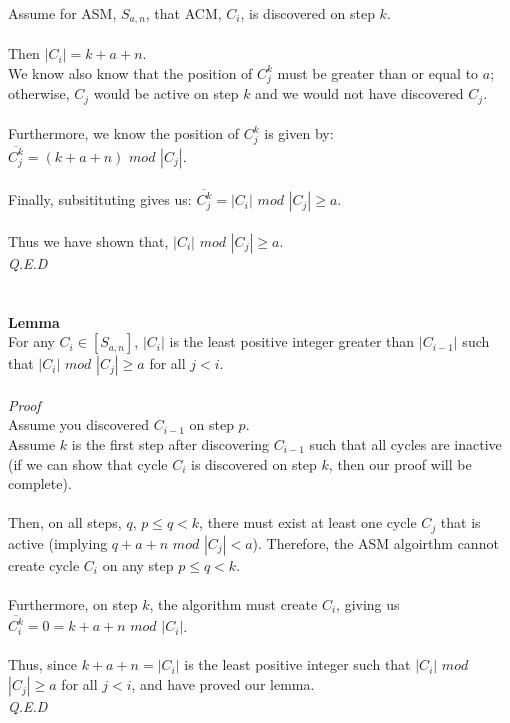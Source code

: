 \documentclass[a4paper,12pt]{article}
\begin{document}
Assume for ASM, $S_{a,n}$, that ACM, $C_i$, is discovered on step $k$.\\
\\
Then $|C_i| = k + a + n$.\\
We know also know that the position of $C^k_j$ must be greater than or equal to $a$; otherwise, $C_j$ would be active on step $k$ and we would not have discovered $C_j$.\\
\\
Furthermore, we know the position of $C^k_j$ is given by:\\
$\overline{C^k_j} = (k + a + n)$ $mod$ $|C_j|$.\\ 
\\
Finally, subsitituting gives us: $\overline{C^k_j} = |C_i|$ $mod$ $|C_j| \geq a$.\\
\\
Thus we have shown that, $|C_i|$ $mod$ $|C_j| \geq a$.\\
\textit{Q.E.D}\\ 
\\
\\
\textbf{Lemma}\\
For any $C_i \in [S_{a,n}]$, $|C_i|$ is the least positive integer greater than $|C_{i-1}|$ such that $|C_i|$ $mod$ $|C_j| \geq a$ for all $j < i$.\\
\\
\textit{Proof}\\
Assume you discovered $C_{i-1}$ on step $p$.\\
Assume $k$ is the first step after discovering $C_{i-1}$ such that all cycles are inactive (if we can show that cycle $C_i$ is discovered on step $k$, then our proof will be complete).\\
\\
Then, on all steps, $q$, $p \leq q < k$, there must exist at least one cycle $C_j$ that is active (implying $q + a + n$ $mod$ $|C_j| < a$). Therefore, the ASM algoirthm cannot create cycle $C_i$ on any step $p \leq q < k$.\\
\\
Furthermore, on step $k$, the algorithm must create $C_i$, giving us $\overline{C^k_i} = 0 = k + a + n$ $mod$ $|C_i|$.\\
\\
Thus, since $k + a + n = |C_i|$ is the least positive integer such that $|C_i|$ $mod$ $|C_j| \geq a$ for all $j < i$, and have proved our lemma.\\
\textit{Q.E.D}\\
\\
\end{document}

